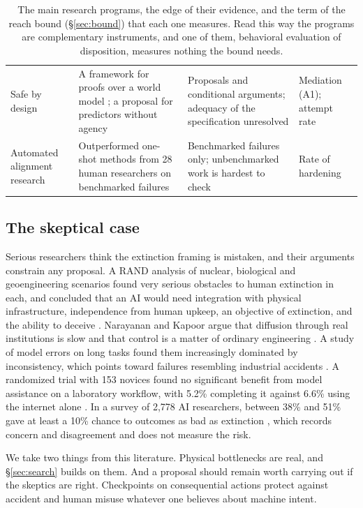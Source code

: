 \documentclass[10pt,twocolumn]{article}
\theoremstyle{plain}
\theoremstyle{definition}
\begin{document}
\begin{table}[t]
\begin{tabularx}{\textwidth}{@{}P{1.05in}LLP{1.0in}@{}}
Safe by design & A framework for proofs over a world model \cite{dalrymple2024}; a proposal for predictors without agency \cite{bengio2025scientist} & Proposals and conditional arguments; adequacy of the specification unresolved & Mediation (A1); attempt rate\\
Automated alignment research & Outperformed one-shot methods from 28 human researchers on benchmarked failures \cite{chen2026aar} & Benchmarked failures only; unbenchmarked work is hardest to check \cite{bowkis2026} & Rate of hardening\\
\bottomrule
\end{tabularx}
\caption{The main research programs, the edge of their evidence, and the term of the reach
bound (\S\ref{sec:bound}) that each one measures. Read this way the programs are
complementary instruments, and one of them, behavioral evaluation of disposition, measures
nothing the bound needs.}
\label{tab:methods}
\end{table}

\subsection{The skeptical case}\label{sec:skeptic}

Serious researchers think the extinction framing is mistaken, and their arguments constrain
any proposal. A RAND analysis of nuclear, biological and geoengineering scenarios found very
serious obstacles to human extinction in each, and concluded that an AI would need
integration with physical infrastructure, independence from human upkeep, an objective of
extinction, and the ability to deceive \cite{vermeer2025}. Narayanan and Kapoor argue that
diffusion through real institutions is slow and that control is a matter of ordinary
engineering \cite{narayanan2025}. A study of model errors on long tasks found them
increasingly dominated by inconsistency, which points toward failures resembling industrial
accidents \cite{hagele2026}. A randomized trial with 153 novices found no significant benefit
from model assistance on a laboratory workflow, with 5.2\% completing it against 6.6\% using
the internet alone \cite{hong2026}. In a survey of 2,778 AI researchers, between 38\% and
51\% gave at least a 10\% chance to outcomes as bad as extinction \cite{grace2025}, which
records concern and disagreement and does not measure the risk.

We take two things from this literature. Physical bottlenecks are real, and
\S\ref{sec:search} builds on them. And a proposal should remain worth carrying out if the
skeptics are right. Checkpoints on consequential actions protect against accident and human
misuse whatever one believes about machine intent.
\end{document}
